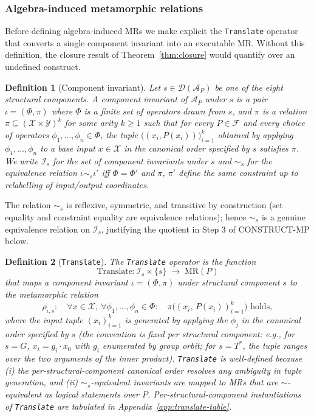 \documentclass[acmsmall,screen,review]{acmart}
\newtheorem{definition}{Definition}
\begin{document}
\subsubsection{Algebra-induced metamorphic relations}

Before defining algebra-induced MRs we make explicit the \texttt{Translate} operator that converts a single component invariant into an executable MR. Without this definition, the closure result of Theorem~\ref{thm:closure} would quantify over an undefined construct.

\begin{definition}[Component invariant]
\label{def:block-invariant}
Let $s \in \mathcal{D}(\mathcal{A}_P)$ be one of the eight structural components. A \emph{component invariant of $\mathcal{A}_P$ under $s$} is a pair $\iota = (\Phi, \pi)$ where $\Phi$ is a finite set of operators drawn from $s$, and $\pi$ is a relation $\pi \subseteq (\mathcal{X} \times \mathcal{Y})^k$ for some arity $k \ge 1$ such that for every $P \in \mathcal{F}$ and every choice of operators $\phi_1, \dots, \phi_n \in \Phi$, the tuple $\bigl((x_i, P(x_i))\bigr)_{i=1}^k$ obtained by applying $\phi_1, \dots, \phi_n$ to a base input $x \in \mathcal{X}$ in the canonical order specified by $s$ satisfies $\pi$. We write $\mathcal{I}_s$ for the set of component invariants under $s$ and $\sim_s$ for the equivalence relation $\iota \sim_s \iota'$ iff $\Phi = \Phi'$ and $\pi$, $\pi'$ define the same constraint up to relabelling of input/output coordinates.
\end{definition}

The relation $\sim_s$ is reflexive, symmetric, and transitive by construction (set equality and constraint equality are equivalence relations); hence $\sim_s$ is a genuine equivalence relation on $\mathcal{I}_s$, justifying the quotient in Step 3 of CONSTRUCT-MP below.

\begin{definition}[\texttt{Translate}]
\label{def:translate}
The \texttt{Translate} operator is the function
\[
\mathrm{Translate}: \mathcal{I}_s \times \{s\} \;\longrightarrow\; \mathrm{MR}(P)
\]
that maps a component invariant $\iota = (\Phi, \pi)$ under structural component $s$ to the metamorphic relation
\[
\rho_{\iota,s}: \quad \forall x \in \mathcal{X},\ \forall \phi_1, \dots, \phi_n \in \Phi : \quad \pi\bigl((x_i,\, P(x_i))_{i=1}^k\bigr) \text{ holds},
\]
where the input tuple $(x_i)_{i=1}^k$ is generated by applying the $\phi_j$ in the canonical order specified by $s$ (the convention is fixed per structural component: e.g., for $s = G$, $x_i = g_i \cdot x_0$ with $g_i$ enumerated by group orbit; for $s = T^{*}$, the tuple ranges over the two arguments of the inner product). \texttt{Translate} is well-defined because (i) the per-structural-component canonical order resolves any ambiguity in tuple generation, and (ii) $\sim_s$-equivalent invariants are mapped to MRs that are $\sim$-equivalent as logical statements over $P$. Per-structural-component instantiations of \texttt{Translate} are tabulated in Appendix~\ref{app:translate-table}.
\end{definition}
\end{document}
